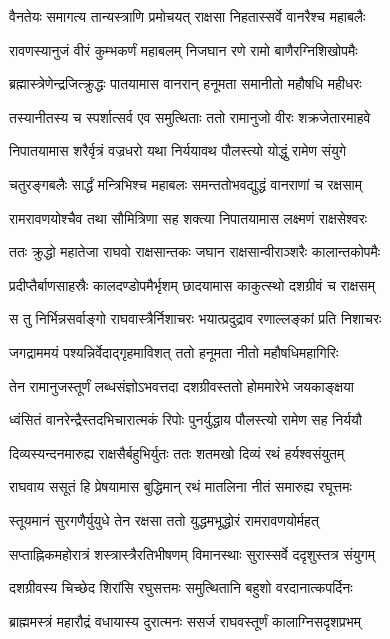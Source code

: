 \twolineshloka
{वैनतेयः समागत्य तान्यस्त्राणि प्रमोचयत्}
{राक्षसा निहतास्सर्वे वानरैश्च महाबलैः}%

\twolineshloka
{रावणस्यानुजं वीरं कुम्भकर्णं महाबलम्}
{निजघान रणे रामो बाणैरग्निशिखोपमैः}%

\twolineshloka
{ब्रह्मास्त्रेणेन्द्रजित्क्रुद्धः पातयामास वानरान्}
{हनूमता समानीतो महौषधि महीधरः}%

\twolineshloka
{तस्यानीतस्य च स्पर्शात्सर्व एव समुत्थिताः}
{ततो रामानुजो वीरः शक्रजेतारमाहवे}%

\twolineshloka
{निपातयामास शरैर्वृत्रं वज्रधरो यथा}
{निर्ययावथ पौलस्त्यो योद्धुं रामेण संयुगे}%

\twolineshloka
{चतुरङ्गबलैः सार्द्धं मन्त्रिभिश्च महाबलः}
{समन्ततोभवद्युद्धं वानराणां च रक्षसाम्}%

\twolineshloka
{रामरावणयोश्चैव तथा सौमित्रिणा सह}
{शक्त्या निपातयामास लक्ष्मणं राक्षसेश्वरः}%

\twolineshloka
{ततः क्रुद्धो महातेजा राघवो राक्षसान्तकः}
{जघान राक्षसान्वीराञ्शरैः कालान्तकोपमैः}%

\twolineshloka
{प्रदीप्तैर्बाणसाहस्रैः कालदण्डोपमैर्भृशम्}
{छादयामास काकुत्स्थो दशग्रीवं च राक्षसम्}%

\twolineshloka
{स तु निर्भिन्नसर्वाङ्गो राघवास्त्रैर्निशाचरः}
{भयात्प्रदुद्राव रणाल्लङ्कां प्रति निशाचरः}%

\twolineshloka
{जगद्राममयं पश्यन्निर्वेदाद्गृहमाविशत्}
{ततो हनूमता नीतो महौषधिमहागिरिः}%

\twolineshloka
{तेन रामानुजस्तूर्णं लब्धसंज्ञोऽभवत्तदा}
{दशग्रीवस्ततो होममारेभे जयकाङ्क्षया}%

\twolineshloka
{ध्वंसितं वानरेन्द्रैस्तदभिचारात्मकं रिपोः}
{पुनर्युद्धाय पौलस्त्यो रामेण सह निर्ययौ}%

\twolineshloka
{दिव्यस्यन्दनमारुह्य राक्षसैर्बहुभिर्युतः}
{ततः शतमखो दिव्यं रथं हर्यश्वसंयुतम्}%

\twolineshloka
{राघवाय ससूतं हि प्रेषयामास बुद्धिमान्}
{रथं मातलिना नीतं समारुह्य रघूत्तमः}%

\twolineshloka
{स्तूयमानं सुरगणैर्युयुधे तेन रक्षसा}
{ततो युद्धमभूद्धोरं रामरावणयोर्महत्}%

\twolineshloka
{सप्ताह्निकमहोरात्रं शस्त्रास्त्रैरतिभीषणम्}
{विमानस्थाः सुरास्सर्वे ददृशुस्तत्र संयुगम्}%

\twolineshloka
{दशग्रीवस्य चिच्छेद शिरांसि रघुसत्तमः}
{समुत्थितानि बहुशो वरदानात्कपर्दिनः}%

\twolineshloka
{ब्राह्ममस्त्रं महारौद्रं वधायास्य दुरात्मनः}
{ससर्ज राघवस्तूर्णं कालाग्निसदृशप्रभम्}%

